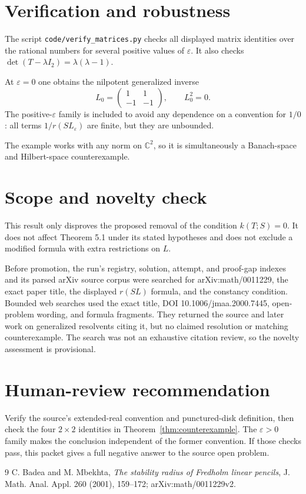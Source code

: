 \documentclass[11pt]{article}
\newcommand{\C}{\mathbb C}
\begin{document}
\section{Verification and robustness}

The script \texttt{code/verify\_matrices.py} checks all displayed matrix
identities over the rational numbers for several positive values of
$\varepsilon$.  It also checks
$\det(T-\lambda I_2)=\lambda(\lambda-1)$.

At $\varepsilon=0$ one obtains the nilpotent generalized inverse
\[
L_0=\begin{pmatrix}1&1\\-1&-1\end{pmatrix},\qquad L_0^2=0.
\]
The positive-$\varepsilon$ family is included to avoid any dependence on a
convention for $1/0$: all terms $1/r(SL_\varepsilon)$ are finite, but they
are unbounded.

The example works with any norm on $\C^2$, so it is simultaneously a
Banach-space and Hilbert-space counterexample.

\section{Scope and novelty check}

This result only disproves the proposed removal of the condition
$k(T;S)=0$.  It does not affect Theorem 5.1 under its stated hypotheses and
does not exclude a modified formula with extra restrictions on $L$.

Before promotion, the run's registry, solution, attempt, and proof-gap
indexes and its parsed arXiv source corpus were searched for
arXiv:math/0011229, the exact paper title, the displayed $r(SL)$ formula,
and the constancy condition.  Bounded web searches used the exact title,
DOI 10.1006/jmaa.2000.7445, open-problem wording, and formula fragments.
They returned the source and later work on generalized resolvents citing it,
but no claimed resolution or matching counterexample.  The search was not an
exhaustive citation review, so the novelty assessment is provisional.

\section{Human-review recommendation}

Verify the source's extended-real convention and punctured-disk definition,
then check the four $2\times2$ identities in Theorem~\ref{thm:counterexample}.
The $\varepsilon>0$ family makes the conclusion independent of the former
convention.  If those checks pass, this packet gives a full negative answer
to the source open problem.

\begin{thebibliography}{9}
C. Badea and M. Mbekhta,
\emph{The stability radius of Fredholm linear pencils},
J. Math. Anal. Appl. 260 (2001), 159--172;
arXiv:math/0011229v2.
\end{thebibliography}
\end{document}
